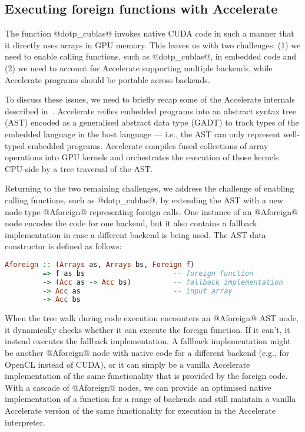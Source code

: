 \subsection{Executing foreign functions with Accelerate}

The function @dotp_cublas@ invokes native CUDA code in such a manner that it directly uses arrays in GPU memory. This leaves us with two challenges: (1) we need to enable calling functions, such as @dotp_cublas@, in embedded code and (2) we need to account for Accelerate supporting multiple backends, while Accelerate programs should be portable across backends.

To discuss these issues, we need to briefly recap some of the Accelerate internals described in~\cite{Chakravarty:acc-cuda}. Accelerate reifies embedded programs into an abstract syntax tree (AST) encoded as a generalised abstract data type (GADT) to track types of the embedded language in the host language --- i.e., the AST can only represent well-typed embedded programs. Accelerate compiles fused collections of array operations into GPU kernels and orchestrates the execution of those kernels CPU-side by a tree traversal of the AST.

Returning to the two remaining challenges, we address the challenge of enabling calling functions, such as @dotp_cublas@, by extending the AST with a new node type @Aforeign@ representing foreign calls. One instance of an @Aforeign@ node encodes the code for one backend, but it also contains a fallback implementation in case a different backend is being used. The AST data constructor is defined as follows:
%
\begin{lstlisting}[language=haskell]
Aforeign :: (Arrays as, Arrays bs, Foreign f)
         => f as bs                     -- foreign function
         -> (Acc as -> Acc bs)          -- fallback implementation
         -> Acc as                      -- input array
         -> Acc bs
\end{lstlisting}
%
When the tree walk during code execution encounters an @Aforeign@ AST node, it dynamically checks whether it can execute the foreign function. If it can't, it instead executes the fallback implementation. A fallback implementation might be another @Aforeign@ node with native code for a different backend (e.g., for OpenCL instead of CUDA), or it can simply be a vanilla Accelerate implementation of the same functionality that is provided by the foreign code. With a cascade of @Aforeign@ nodes, we can provide an optimised native implementation of a function for a range of backends and still maintain a vanilla Accelerate version of the same functionality for execution in the Accelerate interpreter.


